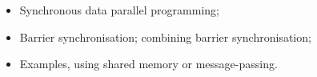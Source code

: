 \documentclass[notes,color]{sepslide0}
\def\upto{\mathbin{..}}
\begin{document}
\begin{comment}
The threads can then perform another barrier synchronisation before the next
round. 
\end{slide}


\begin{slide}
\heading{The pattern of synchronisation}

This pattern of synchronisation is very common:
%
\begin{scala}
<initialisation>
barrier.sync
while(true){
  <read all variables>
  barrier.sync
  <write own variables>
  barrier.sync
}
\end{scala}
%
The final synchronisation on each iteration could be replaced by a
synchronisation using a combining barrier, to decide whether to continue.
\end{slide}


\begin{slide}
\heading{Load balancing}

We want to choose the sets $S$ allocated to different threads so as to
balance the total load.

Note that the cost of calculating all the forces for particle~$i$ is
$\Theta(N-i)$: not all particles are equal in this regard.

One way to balance the load is to split the $N$ particles into $2p$
segments, each of size $segSize = N/2p$.  Then we can allocate process~$me$
the segments~$me$ and $2p-me-1$, i.e.\ particles $[me.segSize \upto
  (me+1).segSize)$ and $[(2p-me-1).segSize \upto (2p-me).segSize)$.
\end{slide}
\end{comment}



\begin{slide}

\begin{itemize}
\item 
Synchronous data parallel programming;

\item
Barrier synchronisation; combining barrier synchronisation;

\item
Examples, using shared memory or message-passing.
\end{itemize}
\end{slide}
\end{document}
